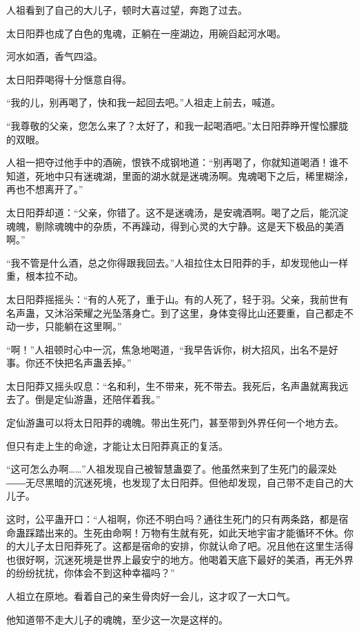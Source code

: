 
\begin{this_body}

人祖看到了自己的大儿子，顿时大喜过望，奔跑了过去。

太日阳莽也成了白色的鬼魂，正躺在一座湖边，用碗舀起河水喝。

河水如酒，香气四溢。

太日阳莽喝得十分惬意自得。

“我的儿，别再喝了，快和我一起回去吧。”人祖走上前去，喊道。

“我尊敬的父亲，您怎么来了？太好了，和我一起喝酒吧。”太日阳莽睁开惺忪朦胧的双眼。

人祖一把夺过他手中的酒碗，恨铁不成钢地道：“别再喝了，你就知道喝酒！谁不知道，死地中只有迷魂湖，里面的湖水就是迷魂汤啊。鬼魂喝下之后，稀里糊涂，再也不想离开了。”

太日阳莽却道：“父亲，你错了。这不是迷魂汤，是安魂酒啊。喝了之后，能沉淀魂魄，剔除魂魄中的杂质，不再躁动，得到心灵的大宁静。这是天下极品的美酒啊。”

“我不管是什么酒，总之你得跟我回去。”人祖拉住太日阳莽的手，却发现他山一样重，根本拉不动。

太日阳莽摇摇头：“有的人死了，重于山。有的人死了，轻于羽。父亲，我前世有名声蛊，又沐浴荣耀之光坠落身亡。到了这里，身体变得比山还要重，自己都走不动一步，只能躺在这里啊。”

“啊！”人祖顿时心中一沉，焦急地喝道，“我早告诉你，树大招风，出名不是好事。你还不快把名声蛊丢掉。”

太日阳莽又摇头叹息：“名和利，生不带来，死不带去。我死后，名声蛊就离我远去了。倒是定仙游蛊，还陪伴着我。”

定仙游蛊可以将太日阳莽的魂魄。带出生死门，甚至带到外界任何一个地方去。

但只有走上生的命途，才能让太日阳莽真正的复活。

“这可怎么办啊……”人祖发现自己被智慧蛊耍了。他虽然来到了生死门的最深处――无尽黑暗的沉迷死境，也发现了太日阳莽。但他却发现，自己带不走自己的大儿子。

这时，公平蛊开口：“人祖啊，你还不明白吗？通往生死门的只有两条路，都是宿命蛊踩踏出来的。生死由命啊！万物有生就有死，如此天地宇宙才能循环不休。你的大儿子太日阳莽死了。这都是宿命的安排，你就认命了吧。况且他在这里生活得也很好啊，沉迷死境是世界上最安宁的地方。他喝着天底下最好的美酒，再无外界的纷纷扰扰，你体会不到这种幸福吗？”

人祖立在原地。看着自己的亲生骨肉好一会儿，这才叹了一大口气。

他知道带不走大儿子的魂魄，至少这一次是这样的。


\end{this_body}
